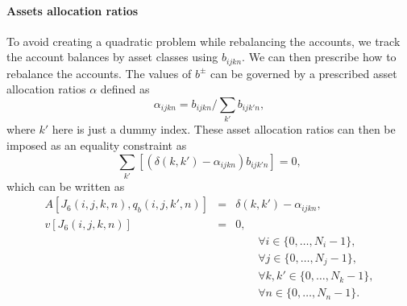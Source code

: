 \documentclass{article}[fleqn,12pt]
\begin{document}
\paragraph*{Assets allocation ratios}
To avoid creating a quadratic problem while rebalancing the accounts, we track the account balances
by asset classes using $b_{ijkn}$. We can then prescribe how to rebalance the accounts.
The values of $b^\pm$ can be governed by a prescribed asset allocation ratios $\alpha$ defined as
\begin{equation}
	\label{Eq:Alloc1}
	\alpha_{ijkn} = b_{ijkn}/\sum_{k'} b_{ijk'n},
\end{equation}
where $k'$ here is just a dummy index.
These asset allocation ratios can then be imposed as an equality constraint as
\begin{equation}
	\label{Eq:Alloc2}
	\sum_{k'} [(\delta(k, k') - \alpha_{ijkn}) b_{ijk'n}] = 0,
\end{equation}
which can be written as
\begin{eqnarray}
	\label{Eq:Alloc3}
	A[J_6(i, j, k, n), q_b(i, j, k', n)] &=& \delta(k, k') - \alpha_{ijkn}, \nonumber\\
	v[J_6(i, j, k, n)] &=& 0, \\
	&&\qquad\forall i \in \{0,\ldots, N_i-1\},\nonumber\\
	&&\qquad\forall j \in \{0,\ldots, N_j-1\},\nonumber\\
	&&\qquad\forall k,k' \in \{0,\ldots, N_k-1\},\nonumber\\
	&&\qquad\forall n \in \{0,\ldots, N_n-1\}. \nonumber
\end{eqnarray}
\end{document}
